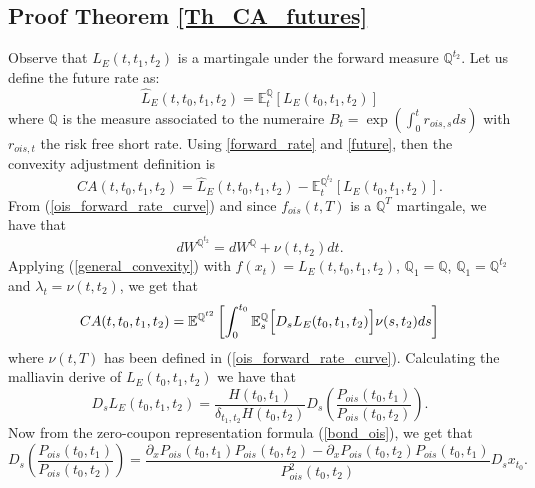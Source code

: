\documentclass[a4paper,10pt]{article}
\newcommand{\1}{\mathbf{1}}
\begin{document}
\subsection{Proof Theorem \ref{Th_CA_futures}}\label{Proof_CA_futures}
Observe that $L_{E}(t, t_1, t_2)$ is a martingale under the forward measure $\mathbb{Q}^{t_2}$. Let us define the future rate as:    
\begin{equation}\label{future}
\hat{L}_{E}(t,t_0, t_1, t_2) = \mathbb{E}_t^{\mathbb{Q}}\left[L_{E}(t_0, t_1, t_2) \right]
\end{equation}
where $\mathbb{Q}$ is the measure associated to the numeraire $B_t=\exp\left(\int_{0}^{t} r_{ois, s} ds \right)$ with $ r_{ois, t}$ the risk free short rate. Using
\eqref{forward_rate} and \eqref{future}, then the convexity adjustment definition is
\begin{equation*}
CA(t, t_0, t_1, t_2) = \hat{L}_{E}(t,t_0, t_1, t_2) - \mathbb{E}_t^{\mathbb{Q}^{t_2}}\left[L_{E}(t_0, t_1, t_2) \right].
\end{equation*}
From (\ref{ois_forward_rate_curve}) and since $f_{ois}(t,T)$ is a $\mathbb{Q}^{T}$ martingale, we have that
\begin{equation}\label{girsanov_spot_forward}
dW^{\mathbb{Q}^{t_2}} = dW^{\mathbb{Q}} + \nu(t,t_2) dt. 
\end{equation}
Applying (\ref{general_convexity}) with $f(x_t)=L_{E}(t,t_0, t_1, t_2)$, $\mathbb{Q}_1=\mathbb{Q}$, $\mathbb{Q}_1=\mathbb{Q}^{t_2}$ and $\lambda_t = \nu(t,t_2)$,  we get that
\begin{equation}\label{ca_general_future}
CA(t, t_0, t_1, t_2) = \mathbb{E}^{\mathbb{Q}^{t2}}\left[\int_{0}^{t_0} \mathbb{E}^{\mathbb{Q}}_{s}\Bigl[D_s L_{E}(t_0,t_1,t_2) \Bigr] \nu(s,t_2) ds \right]
\end{equation}
where $\nu(t,T)$ has been defined in (\ref{ois_forward_rate_curve}). Calculating the malliavin derive of $L_{E}(t_0,t_1,t_2)$ we have that
\begin{equation*}
D_s L_{E}(t_0,t_1,t_2) = \frac{H(t_0,t_1)}{\delta_{t_1,t_2}H(t_0,t_2)} D_s \left(\frac{P_{ois}(t_0,t_1)}{P_{ois}(t_0,t_2)}\right).
\end{equation*}
Now from the zero-coupon representation formula (\ref{bond_ois}), we get that
\begin{equation*}
D_s \left(\frac{P_{ois}(t_0,t_1)}{P_{ois}(t_0,t_2)}\right) = \frac{\partial_{x}P_{ois}(t_0,t_1)P_{ois}(t_0,t_2) - \partial_{x}P_{ois}(t_0,t_2) P_{ois}(t_0,t_1)}{P^{2}_{ois}(t_0,t_2)} D_s x_{t_0}.
\end{equation*}
\end{document}
